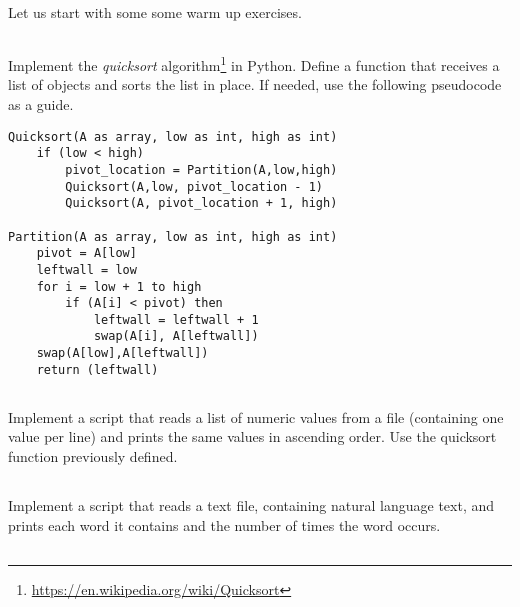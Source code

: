 \documentclass[12pt]{article}
\begin{document}

\section{}

Let us start with some some warm up exercises.

\subsection{}

Implement the \emph{quicksort} algorithm\footnote{\url{https://en.wikipedia.org/wiki/Quicksort}} in Python. Define a function that receives a list of objects and sorts the list in place. If needed, use the following pseudocode as a guide.

\footnotesize
\begin{verbatim}
Quicksort(A as array, low as int, high as int)
    if (low < high)
        pivot_location = Partition(A,low,high)
        Quicksort(A,low, pivot_location - 1)
        Quicksort(A, pivot_location + 1, high)

Partition(A as array, low as int, high as int)
    pivot = A[low]
    leftwall = low
    for i = low + 1 to high
        if (A[i] < pivot) then
            leftwall = leftwall + 1
            swap(A[i], A[leftwall])
    swap(A[low],A[leftwall])
    return (leftwall)
\end{verbatim}
\normalsize

\subsection{}

 Implement a script that reads a list of numeric values from a file (containing one value per line) and prints the same values in ascending order. Use the quicksort function previously defined.

\subsection{}

Implement a script that reads a text file, containing natural language text, and prints each word it contains and the number of times the word occurs.

\subsection{}
\end{document}
